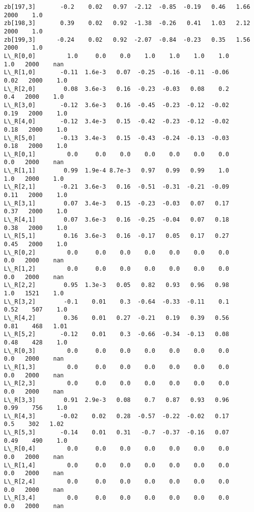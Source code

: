 \documentclass[11pt]{article}
\begin{document}
\begin{Verbatim}[commandchars=\\\{\}]
zb[197,3]       -0.2    0.02   0.97  -2.12  -0.85  -0.19   0.46   1.66   2000    1.0
zb[198,3]       0.39    0.02   0.92  -1.38  -0.26   0.41   1.03   2.12   2000    1.0
zb[199,3]      -0.24    0.02   0.92  -2.07  -0.84  -0.23   0.35   1.56   2000    1.0
L\_R[0,0]         1.0     0.0    0.0    1.0    1.0    1.0    1.0    1.0   2000    nan
L\_R[1,0]       -0.11  1.6e-3   0.07  -0.25  -0.16  -0.11  -0.06   0.02   2000    1.0
L\_R[2,0]        0.08  3.6e-3   0.16  -0.23  -0.03   0.08    0.2    0.4   2000    1.0
L\_R[3,0]       -0.12  3.6e-3   0.16  -0.45  -0.23  -0.12  -0.02   0.19   2000    1.0
L\_R[4,0]       -0.12  3.4e-3   0.15  -0.42  -0.23  -0.12  -0.02   0.18   2000    1.0
L\_R[5,0]       -0.13  3.4e-3   0.15  -0.43  -0.24  -0.13  -0.03   0.18   2000    1.0
L\_R[0,1]         0.0     0.0    0.0    0.0    0.0    0.0    0.0    0.0   2000    nan
L\_R[1,1]        0.99  1.9e-4 8.7e-3   0.97   0.99   0.99    1.0    1.0   2000    1.0
L\_R[2,1]       -0.21  3.6e-3   0.16  -0.51  -0.31  -0.21  -0.09   0.11   2000    1.0
L\_R[3,1]        0.07  3.4e-3   0.15  -0.23  -0.03   0.07   0.17   0.37   2000    1.0
L\_R[4,1]        0.07  3.6e-3   0.16  -0.25  -0.04   0.07   0.18   0.38   2000    1.0
L\_R[5,1]        0.16  3.6e-3   0.16  -0.17   0.05   0.17   0.27   0.45   2000    1.0
L\_R[0,2]         0.0     0.0    0.0    0.0    0.0    0.0    0.0    0.0   2000    nan
L\_R[1,2]         0.0     0.0    0.0    0.0    0.0    0.0    0.0    0.0   2000    nan
L\_R[2,2]        0.95  1.3e-3   0.05   0.82   0.93   0.96   0.98    1.0   1521    1.0
L\_R[3,2]        -0.1    0.01    0.3  -0.64  -0.33  -0.11    0.1   0.52    507    1.0
L\_R[4,2]        0.36    0.01   0.27  -0.21   0.19   0.39   0.56   0.81    468   1.01
L\_R[5,2]       -0.12    0.01    0.3  -0.66  -0.34  -0.13   0.08   0.48    428    1.0
L\_R[0,3]         0.0     0.0    0.0    0.0    0.0    0.0    0.0    0.0   2000    nan
L\_R[1,3]         0.0     0.0    0.0    0.0    0.0    0.0    0.0    0.0   2000    nan
L\_R[2,3]         0.0     0.0    0.0    0.0    0.0    0.0    0.0    0.0   2000    nan
L\_R[3,3]        0.91  2.9e-3   0.08    0.7   0.87   0.93   0.96   0.99    756    1.0
L\_R[4,3]       -0.02    0.02   0.28  -0.57  -0.22  -0.02   0.17    0.5    302   1.02
L\_R[5,3]       -0.14    0.01   0.31   -0.7  -0.37  -0.16   0.07   0.49    490    1.0
L\_R[0,4]         0.0     0.0    0.0    0.0    0.0    0.0    0.0    0.0   2000    nan
L\_R[1,4]         0.0     0.0    0.0    0.0    0.0    0.0    0.0    0.0   2000    nan
L\_R[2,4]         0.0     0.0    0.0    0.0    0.0    0.0    0.0    0.0   2000    nan
L\_R[3,4]         0.0     0.0    0.0    0.0    0.0    0.0    0.0    0.0   2000    nan

\end{Verbatim}
\end{document}
